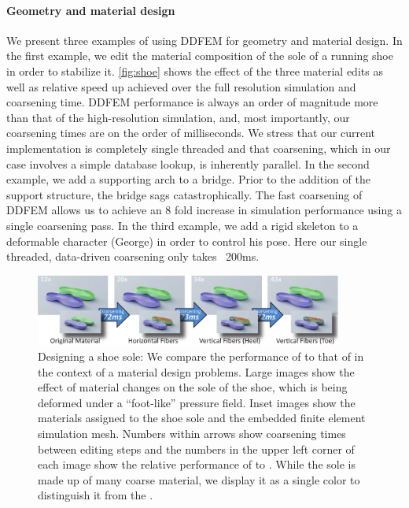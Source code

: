 \paragraph{Geometry and material design} We present three examples of using DDFEM for geometry and material design. In the first example, we edit the material composition of the sole of a running shoe in order to stabilize it. \autoref{fig:shoe} shows the effect of the three material edits as well as relative speed up achieved over the full resolution simulation and coarsening time. DDFEM performance is always an order of magnitude more than that of the high-resolution simulation, and, most importantly, our coarsening times are on the order of milliseconds. We stress that our current implementation is completely single threaded and that coarsening, which in our case involves a simple database lookup, is inherently parallel.
In the second example, we add a supporting arch to a bridge. Prior to the addition of the support structure, the bridge sags catastrophically. The fast coarsening of DDFEM allows us to achieve an 8 fold increase in simulation performance using a single coarsening pass. In the third example, we add a rigid skeleton to a deformable character (George) in order  to control his pose. Here our single threaded, data-driven coarsening only takes ~200ms.  
\begin{figure}
	\centering
	\includegraphics[width=0.90\textwidth]{images/DesignExampleShoe}
	\caption{Designing a shoe sole: We compare the performance of {\DDFEM} to that of {\HiRes} in the context of a material design problems. Large images show the effect of material changes on the sole of the shoe, which is being deformed under a ``foot-like'' pressure field. Inset images show the materials assigned to the shoe sole and the embedded finite element simulation mesh. Numbers within arrows show coarsening times between editing steps and the numbers in the upper left corner of each image show the relative performance of {\DDFEM} to  {\HiRes}. While the {\DDFEM} sole is made up of many coarse material, we display it as a single color to distinguish it from the {\HiRes}.}
	\label{fig:shoe}
\end{figure}


